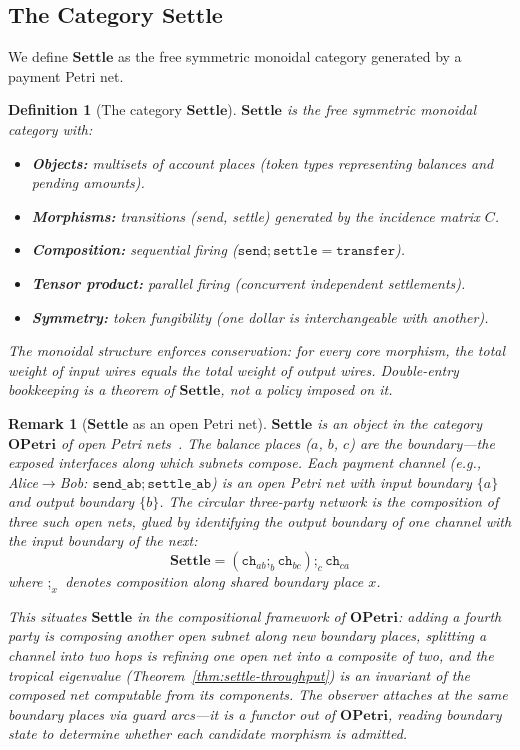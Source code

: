 \documentclass[11pt,a4paper]{article}
\newtheorem{definition}[theorem]{Definition}
\newtheorem{remark}[theorem]{Remark}
\newcommand{\Settle}{\mathbf{Settle}}
\begin{document}
\subsection{The Category $\Settle$}

We define $\Settle$ as the free symmetric monoidal category generated by a payment Petri net.

\begin{definition}[The category $\Settle$]
\label{def:settle}
$\Settle$ is the free symmetric monoidal category with:
\begin{itemize}
  \item \textbf{Objects:} multisets of account places (token types representing balances and pending amounts).
  \item \textbf{Morphisms:} transitions (send, settle) generated by the incidence matrix $C$.
  \item \textbf{Composition:} sequential firing ($\mathtt{send} \mathbin{;} \mathtt{settle} = \mathtt{transfer}$).
  \item \textbf{Tensor product:} parallel firing (concurrent independent settlements).
  \item \textbf{Symmetry:} token fungibility (one dollar is interchangeable with another).
\end{itemize}
The monoidal structure enforces conservation: for every core morphism, the total weight of input wires equals the total weight of output wires.
Double-entry bookkeeping is a theorem of $\Settle$, not a policy imposed on it.
\end{definition}

\begin{remark}[$\Settle$ as an open Petri net]
\label{rem:open-petri}
$\Settle$ is an object in the category $\mathbf{OPetri}$ of open Petri nets~\cite{baez2020}.
The balance places ($a$, $b$, $c$) are the \emph{boundary}---the exposed interfaces along which subnets compose.
Each payment channel (e.g., Alice$\to$Bob: $\mathtt{send\_ab} \mathbin{;} \mathtt{settle\_ab}$) is an open Petri net with input boundary $\{a\}$ and output boundary $\{b\}$.
The circular three-party network is the composition of three such open nets, glued by identifying the output boundary of one channel with the input boundary of the next:
\[
  \Settle = (\mathtt{ch}_{ab} \mathbin{;}_b \mathtt{ch}_{bc}) \mathbin{;}_c \mathtt{ch}_{ca}
\]
where $\mathbin{;}_x$ denotes composition along shared boundary place $x$.

This situates $\Settle$ in the compositional framework of $\mathbf{OPetri}$: adding a fourth party is composing another open subnet along new boundary places, splitting a channel into two hops is refining one open net into a composite of two, and the tropical eigenvalue (Theorem~\ref{thm:settle-throughput}) is an invariant of the composed net computable from its components.
The observer attaches at the same boundary places via guard arcs---it is a functor \emph{out of} $\mathbf{OPetri}$, reading boundary state to determine whether each candidate morphism is admitted.
\end{remark}
\end{document}
